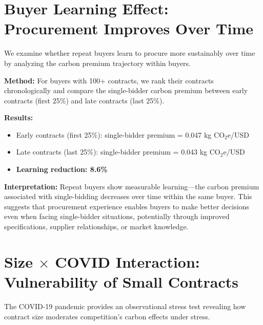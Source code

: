 \documentclass[11pt]{article}
\begin{document}
\section{Buyer Learning Effect: Procurement Improves Over Time}

We examine whether repeat buyers learn to procure more sustainably over time by analyzing the carbon premium trajectory within buyers.

\textbf{Method:} For buyers with 100+ contracts, we rank their contracts chronologically and compare the single-bidder carbon premium between early contracts (first 25\%) and late contracts (last 25\%).

\textbf{Results:}
\begin{itemize}
    \item Early contracts (first 25\%): single-bidder premium = 0.047 kg CO$_2$e/USD
    \item Late contracts (last 25\%): single-bidder premium = 0.043 kg CO$_2$e/USD
    \item \textbf{Learning reduction: 8.6\%}
\end{itemize}

\textbf{Interpretation:} Repeat buyers show measurable learning---the carbon premium associated with single-bidding decreases over time within the same buyer. This suggests that procurement experience enables buyers to make better decisions even when facing single-bidder situations, potentially through improved specifications, supplier relationships, or market knowledge.

\section{Size \texorpdfstring{$\times$}{x} COVID Interaction: Vulnerability of Small Contracts}

The COVID-19 pandemic provides an observational stress test revealing how contract size moderates competition's carbon effects under stress.
\end{document}
